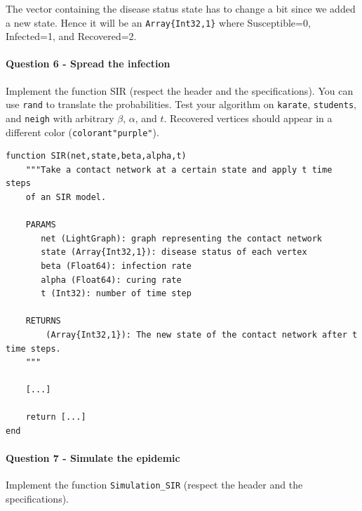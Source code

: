 \documentclass{article}
\begin{document}
The vector containing the disease status state has to change a bit since we added a new state. Hence it will be an \texttt{Array\{Int32,1\}} where Susceptible=0, Infected=1, and Recovered=2.

\paragraph{Question 6 - Spread the infection} Implement the function SIR (respect the header and the specifications). You can use \texttt{rand} to translate the probabilities. Test your algorithm on \texttt{karate}, \texttt{students}, and \texttt{neigh} with arbitrary $\beta$, $\alpha$, and $t$. Recovered vertices should appear in a different color (\texttt{colorant"purple"}).

\begin{verbatim}
function SIR(net,state,beta,alpha,t)
    """Take a contact network at a certain state and apply t time steps
    of an SIR model.
    
    PARAMS
       net (LightGraph): graph representing the contact network
       state (Array{Int32,1}): disease status of each vertex
       beta (Float64): infection rate
       alpha (Float64): curing rate
       t (Int32): number of time step
    
    RETURNS
        (Array{Int32,1}): The new state of the contact network after t time steps.
    """

    [...]

    return [...]
end
\end{verbatim}

\paragraph{Question 7 - Simulate the epidemic}  Implement the function \texttt{Simulation\_SIR} (respect the header and the specifications).
\end{document}
